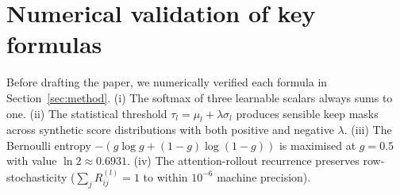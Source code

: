 \documentclass[journal]{IEEEtran}
\begin{document}
\section{Numerical validation of key formulas}\label{app:numerics}
Before drafting the paper, we numerically verified each formula in
Section~\ref{sec:method}.
(i) The softmax of three learnable scalars always sums to one.
(ii) The statistical threshold $\tau_l = \mu_l + \lambda \sigma_l$ produces
sensible keep masks across synthetic score distributions with both positive
and negative $\lambda$.
(iii) The Bernoulli entropy $-(g\log g + (1-g)\log(1-g))$ is maximised at
$g = 0.5$ with value $\ln 2 \approx 0.6931$.
(iv) The attention-rollout recurrence preserves row-stochasticity
($\sum_j R^{(l)}_{ij} = 1$ to within $10^{-6}$ machine precision).




\end{document}
